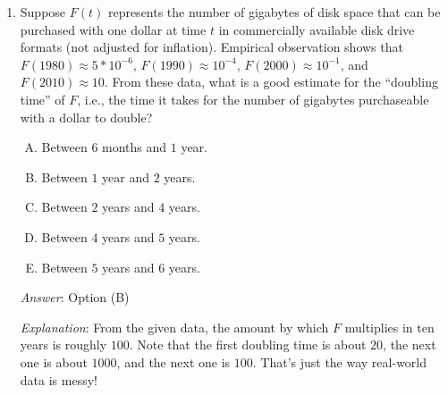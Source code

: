 \documentclass[10pt]{amsart}
\begin{document}
\begin{enumerate}
  {\em Answer}: Option (B)

  {\em Explanation}: Factorize to obtain:

  $$(y' - y)(y' - 2y) = 0$$

  Thus, either $y' = y$ or $y' = 2y$. Note that for both these
  solutions to hold together, we must have $y = 0$ at some point, in
  which case it is identically zero. Thus, it cannot shift from one
  solution to the other. So, either $y' = y$ identically or $y' = 2y$
  identically.

  In case $y' = y$ identically, we get $y = C_1e^x$ and in case $y' =
  2y$ identically, we get $y = C_2e^{2x}$. The general solution can be
  written as $C_1e^x + C_2e^{2x}$, with the proviso that at least one
  among $C_1$ and $C_2$ is zero.

  {\em Performance review}: $7$ out of $10$ got this. $1$ each chose
  (A), (C), and (E).

  {\em Historical note (last year)}: $12$ out of $26$ people got this
  correct. $8$ people chose (C), $4$ people chose (A), $1$ person
  chose (E), and $1$ person left the question blank.

\item Suppose $F(t)$ represents the number of gigabytes of disk space
  that can be purchased with one dollar at time $t$ in commercially
  available disk drive formats (not adjusted for inflation). Empirical
  observation shows that $F(1980) \approx 5 * 10^{-6}$, $F(1990) \approx
  10^{-4}$, $F(2000) \approx 10^{-1}$, and $F(2010) \approx 10$. From
  these data, what is a good estimate for the ``doubling time'' of
  $F$, i.e., the time it takes for the number of gigabytes
  purchaseable with a dollar to double?
  \begin{enumerate}[(A)]
  \item Between $6$ months and $1$ year.
  \item Between $1$ year and $2$ years.
  \item Between $2$ years and $4$ years.
  \item Between $4$ years and $5$ years.
  \item Between $5$ years and $6$ years.
  \end{enumerate}

  {\em Answer}: Option (B)

  {\em Explanation}: From the given data, the amount by which $F$
  multiplies in ten years is roughly $100$. Note that the first
  doubling time is about $20$, the next one is about $1000$, and the
  next one is $100$. That's just the way real-world data is messy!


\end{enumerate}
\end{document}
